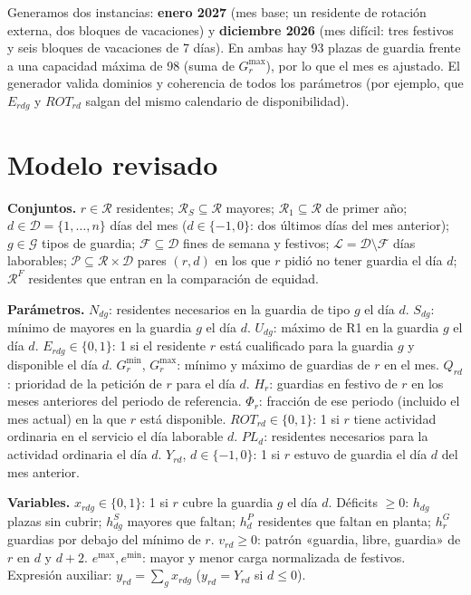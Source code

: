 \documentclass[10pt,a4paper]{article}
\newcommand{\R}{\mathcal{R}}\newcommand{\D}{\mathcal{D}}\newcommand{\G}{\mathcal{G}}
\newcommand{\F}{\mathcal{F}}\newcommand{\Lab}{\mathcal{L}}\newcommand{\Pet}{\mathcal{P}}
\begin{document}
Generamos dos instancias: \textbf{enero 2027} (mes base; un residente de rotación externa, dos bloques de vacaciones) y \textbf{diciembre 2026} (mes difícil: tres festivos y seis bloques de vacaciones de 7 días). En ambas hay 93 plazas de guardia frente a una capacidad máxima de 98 (suma de $G^{\max}_r$), por lo que el mes es ajustado. El generador valida dominios y coherencia de todos los parámetros (por ejemplo, que $E_{rdg}$ y $ROT_{rd}$ salgan del mismo calendario de disponibilidad).

\section{Modelo revisado}

\textbf{Conjuntos.} $r\in\R$ residentes; $\R_S\subseteq\R$ mayores; $\R_1\subseteq\R$ de primer año; $d\in\D=\{1,\dots,n\}$ días del mes ($d\in\{-1,0\}$: dos últimos días del mes anterior); $g\in\G$ tipos de guardia; $\F\subseteq\D$ fines de semana y festivos; $\Lab=\D\setminus\F$ días laborables; $\Pet\subseteq\R\times\D$ pares $(r,d)$ en los que $r$ pidió no tener guardia el día $d$; $\R^F$ residentes que entran en la comparación de equidad.

\textbf{Parámetros.} $N_{dg}$: residentes necesarios en la guardia de tipo $g$ el día $d$. $S_{dg}$: mínimo de mayores en la guardia $g$ el día $d$. $U_{dg}$: máximo de R1 en la guardia $g$ el día $d$. $E_{rdg}\in\{0,1\}$: 1 si el residente $r$ está cualificado para la guardia $g$ y disponible el día $d$. $G^{\min}_r$, $G^{\max}_r$: mínimo y máximo de guardias de $r$ en el mes. $Q_{rd}$: prioridad de la petición de $r$ para el día $d$. $H_r$: guardias en festivo de $r$ en los meses anteriores del periodo de referencia. $\Phi_r$: fracción de ese periodo (incluido el mes actual) en la que $r$ está disponible. $ROT_{rd}\in\{0,1\}$: 1 si $r$ tiene actividad ordinaria en el servicio el día laborable $d$. $PL_d$: residentes necesarios para la actividad ordinaria el día $d$. $Y_{rd}$, $d\in\{-1,0\}$: 1 si $r$ estuvo de guardia el día $d$ del mes anterior.

\textbf{Variables.} $x_{rdg}\in\{0,1\}$: 1 si $r$ cubre la guardia $g$ el día $d$. Déficits $\geq0$: $h_{dg}$ plazas sin cubrir; $h^S_{dg}$ mayores que faltan; $h^P_d$ residentes que faltan en planta; $h^G_r$ guardias por debajo del mínimo de $r$. $v_{rd}\geq0$: patrón «guardia, libre, guardia» de $r$ en $d$ y $d+2$. $e^{\max},e^{\min}$: mayor y menor carga normalizada de festivos. Expresión auxiliar: $y_{rd}=\sum_g x_{rdg}$ ($y_{rd}=Y_{rd}$ si $d\leq0$).
\end{document}
